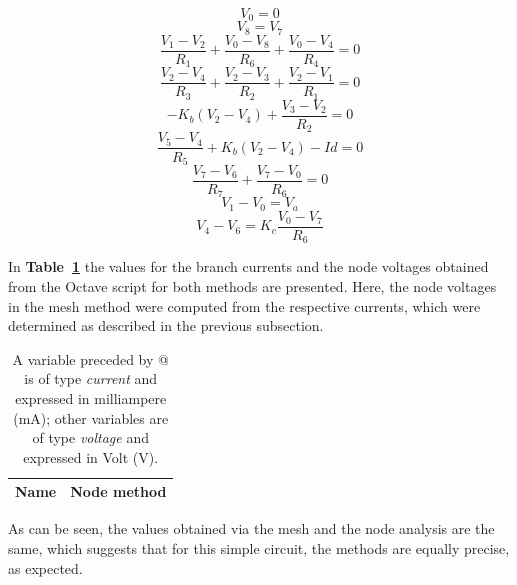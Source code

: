 \begin {equation}
	V_0 = 0
	\label{eq:n1}
\end{equation}
\begin {equation}
	V_8 = V_7
	\label{eq:n2}
\end{equation}
\begin {equation}
	\frac{V_1-V_2}{R_1} + \frac{V_0 - V_8}{R_6} + \frac{V_0 - V_4}{R_4} = 0
	\label{eq:n3}
\end{equation}
\begin {equation}
	\frac{V_2-V_4}{R_3} + \frac{V_2-V_3}{R_2} + \frac{V_2-V_1}{R_1} = 0
	\label{eq:n4}
\end{equation}
\begin {equation}
	- K_b(V_2-V_4) + \frac{V_3-V_2}{R_2} = 0
	\label{eq:n5}
\end{equation}
\begin {equation}
	\frac{V_5-V_4}{R_5} + K_b(V_2-V_4) - Id = 0
	\label{eq:n6}
\end{equation}
\begin {equation}
	\frac{V_7-V_6}{R_7} + \frac{V_7 - V_0}{R_6} = 0
	\label{eq:n7}
\end{equation}
\begin {equation}
	V_1 - V_0 = V_a
	\label{eq:n8}
\end{equation}
\begin {equation}
	V_4 - V_6 = K_c  \frac{V_0 - V_7}{R_6}
	\label{eq:n9}
\end{equation}


In \textbf{Table~\ref{tab:theoretical}} the values for the branch currents and the node voltages obtained from the Octave script for both methods are presented. Here, the node voltages in the mesh method were computed from the respective currents, which were determined as described in the previous subsection.
 \pagebreak 
\begin{table}[h]
  \centering
  \begin{tabular}{|l|r|}
    \hline    
    {\bf Name} & {\bf Node method}\\ \hline
    
  \end{tabular}
  \caption{A variable preceded by @ is of type {\em current}
    and expressed in milliampere (mA); other variables are of type {\it voltage} and expressed in
    Volt (V).}
  \label{tab:theoretical}
\end{table}


As can be seen, the values obtained via the mesh and the node analysis are the same, which suggests that for this simple circuit, the methods are equally precise, as expected.

